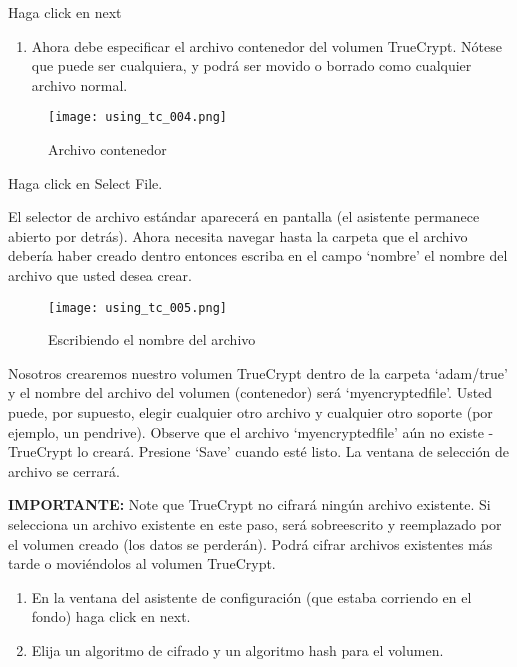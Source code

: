 \documentclass[10pt,a5paper,twoside,,]{book}
\providecommand{\tightlist}{%
  \setlength{\itemsep}{0pt}\setlength{\parskip}{0pt}}
\begin{document}
Haga click en next

\begin{enumerate}
\def\labelenumi{\arabic{enumi}.}
\setcounter{enumi}{4}
\tightlist
\item
  Ahora debe especificar el archivo contenedor del volumen TrueCrypt.
  Nótese que puede ser cualquiera, y podrá ser movido o borrado como
  cualquier archivo normal.
\end{enumerate}

\begin{figure}[htbp]
\centering
\texttt{[image: using\_tc\_004.png]}
\caption{Archivo contenedor}
\end{figure}

Haga click en Select File.

El selector de archivo estándar aparecerá en pantalla (el asistente
permanece abierto por detrás). Ahora necesita navegar hasta la carpeta
que el archivo debería haber creado dentro entonces escriba en el campo
`nombre' el nombre del archivo que usted desea crear.

\begin{figure}[htbp]
\centering
\texttt{[image: using\_tc\_005.png]}
\caption{Escribiendo el nombre del archivo}
\end{figure}

Nosotros crearemos nuestro volumen TrueCrypt dentro de la carpeta
`adam/true' y el nombre del archivo del volumen (contenedor) será
`myencryptedfile'. Usted puede, por supuesto, elegir cualquier otro
archivo y cualquier otro soporte (por ejemplo, un pendrive). Observe que
el archivo `myencryptedfile' aún no existe - TrueCrypt lo creará.
Presione `Save' cuando esté listo. La ventana de selección de archivo se
cerrará.

\textbf{IMPORTANTE:} Note que TrueCrypt no cifrará ningún archivo
existente. Si selecciona un archivo existente en este paso, será
sobreescrito y reemplazado por el volumen creado (los datos se
perderán). Podrá cifrar archivos existentes más tarde o moviéndolos al
volumen TrueCrypt.

\begin{enumerate}
\def\labelenumi{\arabic{enumi}.}
\setcounter{enumi}{5}
\item
  En la ventana del asistente de configuración (que estaba corriendo en
  el fondo) haga click en next.
\item
  Elija un algoritmo de cifrado y un algoritmo hash para el volumen.
\end{enumerate}
\end{document}

